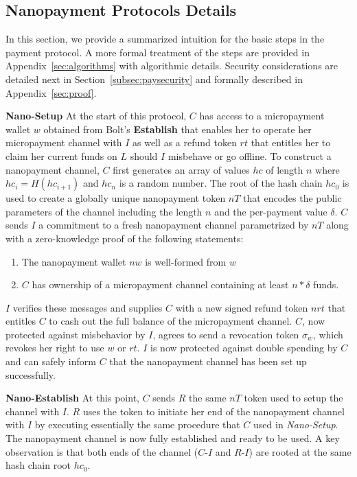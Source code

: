 \subsection{Nanopayment Protocols Details}
\label{sec:nanopaymentdetails}
In this section, we provide a summarized intuition for the basic steps in the
payment protocol. A more formal treatment of the steps are provided in
Appendix~\ref{sec:algorithms} with algorithmic details. Security considerations
are detailed next in Section~\ref{subsec:paysecurity} and formally
described in Appendix~\ref{sec:proof}.


\textbf{Nano-Setup} At the start of this protocol, $C$ has access to a
micropayment wallet $w$ obtained from Bolt's \textbf{Establish} that enables her to operate her micropayment channel
with $I$ as well as a refund token $rt$ that entitles her to claim her current
funds on $L$ should $I$ misbehave or go offline. To construct a nanopayment
channel, $C$ first generates an array of values $hc$ of length $n$ where
$hc_i = H(hc_{i+1})$ and $hc_n$ is a random number. The root of the hash chain
$hc_0$ is used to create a globally unique nanopayment token $nT$ that encodes
the public parameters of the channel including the length $n$ and the
per-payment value $\delta$. $C$ sends $I$ a commitment to a fresh nanopayment
channel parametrized by $nT$ along with a zero-knowledge proof of the following
statements:

\begin{enumerate}
\item The nanopayment wallet $nw$ is well-formed from $w$
\item $C$ has ownership of a micropayment channel containing at least $n *
  \delta$ funds.
\end{enumerate}

$I$ verifies these messages and supplies $C$ with a new signed refund token
$nrt$ that entitles $C$ to cash out the full balance of the micropayment channel.
$C$, now protected against misbehavior by
$I$, agrees to send a revocation token $\sigma_w$, which revokes her right to
use $w$ or $rt$. $I$ is now protected against double spending by $C$ and can
safely inform $C$ that the nanopayment channel has been set up successfully.

\textbf{Nano-Establish} At this point, $C$ sends $R$ the same $nT$ token used to
setup the channel with $I$. $R$ uses the token to initiate her end of the
nanopayment channel with $I$ by executing essentially the same procedure that
$C$ used in \emph{Nano-Setup}. The nanopayment channel is now fully established and
ready to be used. A key observation is that both ends of the channel ($C$-$I$
and $R$-$I$) are rooted at the same hash chain root $hc_0$.

